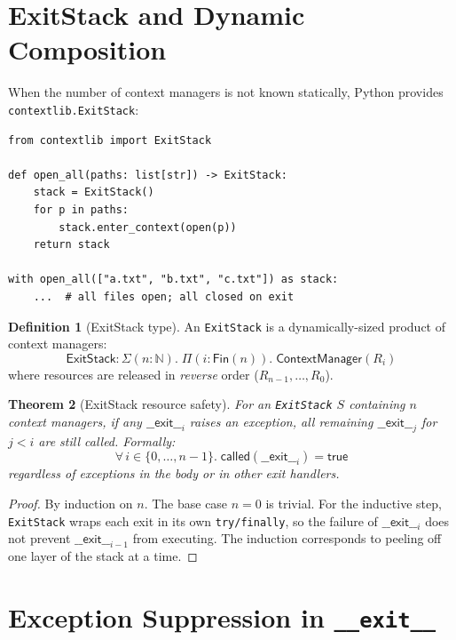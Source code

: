 \documentclass[11pt,a4paper]{report}
\theoremstyle{definition}
\newtheorem{definition}{Definition}[chapter]
\theoremstyle{plain}
\newtheorem{theorem}[definition]{Theorem}
\newcommand{\Nat}{\mathbb{N}}
\begin{document}
\section{ExitStack and Dynamic Composition}

When the number of context managers is not known statically, Python provides
\lstinline[style=python]{contextlib.ExitStack}:

\begin{lstlisting}[style=python]
from contextlib import ExitStack

def open_all(paths: list[str]) -> ExitStack:
    stack = ExitStack()
    for p in paths:
        stack.enter_context(open(p))
    return stack

with open_all(["a.txt", "b.txt", "c.txt"]) as stack:
    ...  # all files open; all closed on exit
\end{lstlisting}

\begin{definition}[ExitStack type]
An \lstinline[style=python]{ExitStack} is a dynamically-sized product of
context managers:
\[
  \mathsf{ExitStack} : \Sigma(n : \Nat).\;
    \Pi(i : \mathsf{Fin}(n)).\; \mathsf{ContextManager}(R_i)
\]
where resources are released in \emph{reverse} order ($R_{n-1}, \ldots, R_0$).
\end{definition}

\begin{theorem}[ExitStack resource safety]
For an \lstinline[style=python]{ExitStack} $S$ containing $n$ context managers,
if any $\mathsf{\_\_exit\_\_}_i$ raises an exception, all remaining
$\mathsf{\_\_exit\_\_}_j$ for $j < i$ are still called.  Formally:
\[
  \forall\, i \in \{0, \ldots, n{-}1\}.\;
    \mathsf{called}(\mathsf{\_\_exit\_\_}_i) = \mathsf{true}
\]
regardless of exceptions in the body or in other exit handlers.
\end{theorem}
\begin{proof}
By induction on $n$.  The base case $n = 0$ is trivial.  For the inductive
step, \lstinline[style=python]{ExitStack} wraps each exit in its own
\texttt{try/finally}, so the failure of $\mathsf{\_\_exit\_\_}_i$ does not
prevent $\mathsf{\_\_exit\_\_}_{i-1}$ from executing.  The induction
corresponds to peeling off one layer of the stack at a time.
\end{proof}

\section{Exception Suppression in \texttt{\_\_exit\_\_}}
\end{document}
